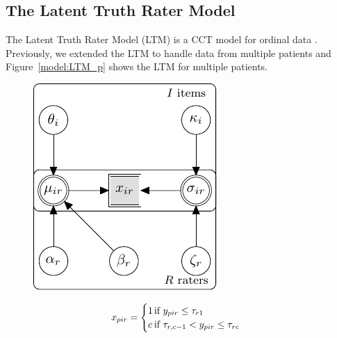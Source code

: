 \documentclass[a4paper,11pt]{article}
\begin{document}
\subsection{The Latent Truth Rater Model}
The Latent Truth Rater Model (LTM) is a CCT model for ordinal data \parencite{Anders2015cultural}.
Previously, we extended the LTM to handle data from multiple patients \parencite{vandenBergh2020cultural} and Figure~\ref{model:LTM_p} shows the LTM for multiple patients.
\begin{figure}[!ht]
	\begin{minipage}{0.55\textwidth}
		\centering
		\includegraphics[width=\textwidth, page=7]{graphicalmodels.pdf}
	\end{minipage}\hfill
	\begin{minipage}{0.45\textwidth}
		{\normalsize
			\begin{align*}
			\oneScore &\assignment
			\begin{cases}
			1		&\hspace{-.3cm} \text{if } \oneAppraisal \leq \Threshold_{\Irater 1} \\
			\Incat	&\hspace{-.3cm} \text{if } \Threshold_{\Irater, \Incat-1} < \oneAppraisal \leq \Threshold_{\Irater\Incat} \\

\end{cases}
\end{align*}}
\end{minipage}
\end{figure}
\end{document}
